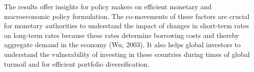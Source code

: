 \documentclass[12pt,bibliography=totoc]{article}
\begin{document}
The results offer insights for policy makers on efficient monetary and macroeconomic policy
formulation. The co-movements of these factors are crucial for monetary authorities to
understand the impact of changes in short-term rates on long-term rates because these rates
determine borrowing costs and thereby aggregate demand in the economy (Wu, 2003). It also
helps global investors to understand the vulnerability of investing in these countries during times
of global turmoil and for efficient portfolio diversification.


%







\end{document}
